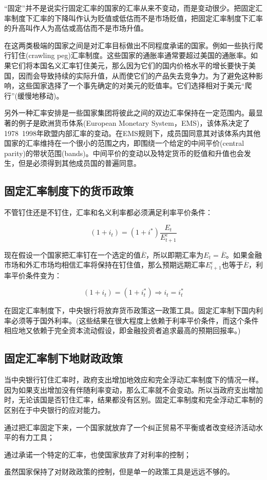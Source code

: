 \documentclass{article}
\begin{document}
“固定”并不是说实行固定汇率的国家的汇率从来不变动，而是变动很少。把固定汇率制度下汇率的下降叫作认为贬值或低估而不是市场贬值，把固定汇率制度下汇率的升高叫作人为高估或高估而不是市场升值。

在这两类极端的国家之间是对汇率目标做出不同程度承诺的国家。例如一些执行爬行钉住(crawling peg)汇率制度。这些国家的通胀率通常要超过美国的通胀率。如果它们将本国名义汇率钉住美元，那么因为它们的国内价格水平的增长要快于美国，因而会导致持续的实际升值，从而使它们的产品失去竞争力。为了避免这种影响，这些国家选择了一个事先确定的对美元的贬值率。它们选择相对于美元“爬行”(缓慢地移动)。

另外一种汇率安排是一些国家集团将彼此之间的双边汇率保持在一定范围内。最显著的例子是欧洲货币体系(European Monetary System，EMS)，该体系决定了1978~1998年欧盟内部汇率的变动。在EMS规则下，成员国同意其对该体系内其他国家的汇率维持在一个很小的范围之内，即围绕一个给定的中间平价(central parity)的带状范围(bands)。中间平价的变动以及特定货币的贬值和升值也会发生，但是必须得到其他成员国的普遍同意。

\subsection{固定汇率制度下的货币政策}

不管钉住还是不钉住，汇率和名义利率都必须满足利率平价条件：

\[
(1+i_t)=(1+i^*)\frac{E_t}{E_{t+1}^e}
\]

现在假设一个国家把汇率钉在一个选定的值$ \overline{E} $，所以即期汇率为$ E_t=\overline{E} $。如果金融市场和外汇市场均相信汇率将保持在钉住值，那么预期远期汇率$ E^e_{t+1} $也等于$ \overline{E} $，利率平价条件变为：

\[
(1+i_t)=(1+i_t^*)\Rightarrow i_t=i^*_t
\]

在固定汇率制度下，中央银行将放弃货币政策这一政策工具。固定汇率制下国内利率必须等于国外利率。(这些结果在很大程度上依赖于利率平价条件，而这个条件相应地又依赖于完全资本流动假设，即金融投资者追求最高的预期回报率。)

\subsection{固定汇率制下地财政政策}

当中央银行钉住汇率时，政府支出增加地效应和完全浮动汇率制度下的情况一样。因为如果支出增加没有伴随利率变动，那么汇率就不会变动。所以当政府支出增加时，无论该国是否钉住汇率，结果都没有区别。固定汇率制度和完全浮动汇率制的区别在于中央银行的应对能力。

\hspace*{\fill}

通过把汇率固定下来，一个国家就放弃了一个纠正贸易不平衡或者改变经济活动水平的有力工具；

通过承诺一个特定的汇率，也使国家放弃了对利率的控制；

虽然国家保持了对财政政策的控制，但是单一的政策工具是远远不够的。
\end{document}
